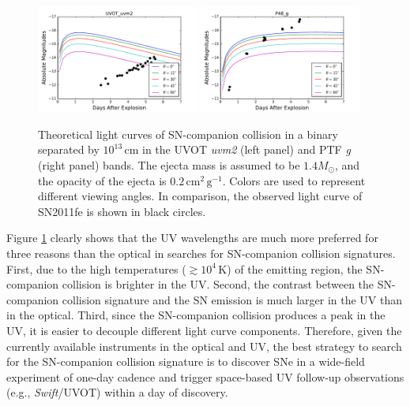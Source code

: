 \documentclass[11pt]{article}
\begin{document}
\begin{figure}[htb]
  \centering
  \includegraphics[width=0.475\textwidth]{UVOT_uvm2.pdf}
  \includegraphics[width=0.475\textwidth]{P48_g.pdf}  
  \caption{Theoretical light curves of SN-companion collision in a
    binary separated by $10^{13}\,\textrm{cm}$ in the UVOT
    \textit{uvm2} (left panel) and PTF \textit{g} (right panel)
    bands. The ejecta mass is assumed to be $1.4M_\odot$, and the
    opacity of the ejecta is
    $0.2\,\textrm{cm}^{2}\,\textrm{g}^{-1}$. Colors are used to
    represent different viewing angles. In comparison, the observed
    light curve of SN2011fe is shown in black circles.}
  \label{fig:sn_companion_collision}
\end{figure}

Figure \ref{fig:sn_companion_collision} clearly shows that the UV
wavelengths are much more preferred for three reasons than the optical
in searches for SN-companion collision signatures.  First, due to the
high temperatures ($\gtrsim10^{4}\,\textrm{K}$) of the emitting
region, the SN-companion collision is brighter in the UV. Second, the
contrast between the SN-companion collision signature and the SN
emission is much larger in the UV than in the optical. Third, since
the SN-companion collision produces a peak in the UV, it is easier to
decouple different light curve components. Therefore, given the
currently available instruments in the optical and UV, the best
strategy to search for the SN-companion collision signature is to
discover SNe in a wide-field experiment of one-day cadence and trigger
space-based UV follow-up observations (e.g., \textit{Swift}/UVOT)
within a day of discovery.
\end{document}
